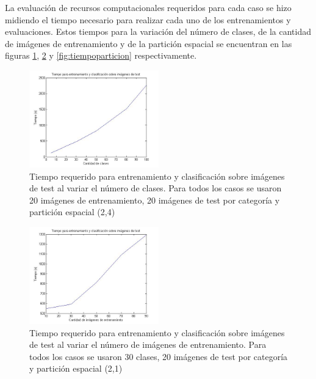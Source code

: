 \documentclass[10pt,twocolumn,letterpaper]{article}
\begin{document}
La evaluación de recursos computacionales requeridos para cada caso se hizo midiendo el tiempo necesario para realizar cada uno de los entrenamientos y evaluaciones. Estos tiempos para la variación del número de clases, de la cantidad de imágenes de entrenamiento y de la partición espacial se encuentran en las figuras \ref{fig:tiempoclases}, \ref{fig:tiempotrain} y \ref{fig:tiempoparticion} respectivamente.

\begin{figure}[h]
    \centering
    \includegraphics[width=0.5\textwidth]{TiempoVariacionNumClases.jpg}
    \caption{Tiempo requerido para entrenamiento y clasificación sobre imágenes de test al variar el número de clases. Para todos los casos se usaron 20 imágenes de entrenamiento, 20 imágenes de test por categoría y partición espacial (2,4)}
    \label{fig:tiempoclases}
\end{figure}

\begin{figure}[h]
    \centering
    \includegraphics[width=0.5\textwidth]{TiempoVariacionNumTrain.jpg}
    \caption{Tiempo requerido para entrenamiento y clasificación sobre imágenes de test al variar el número de imágenes de entrenamiento. Para todos los casos se usaron 30 clases, 20 imágenes de test por categoría y partición espacial (2,1)}
    \label{fig:tiempotrain}
\end{figure}
\end{document}

